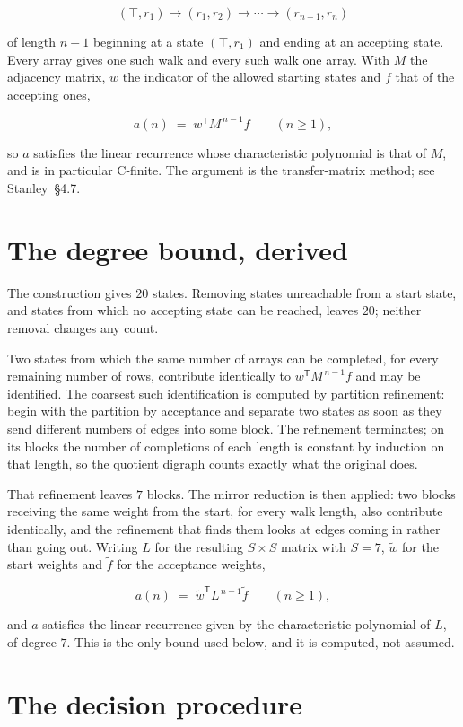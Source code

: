 \documentclass[11pt]{article}
\theoremstyle{definition}
\begin{document}
\[(\top,r_1) \to (r_1,r_2) \to \cdots \to (r_{n-1},r_n)\]

of length $n-1$ beginning at a state $(\top,r_1)$ and ending at an accepting state. Every array gives one such walk and every such walk one array. With $M$ the adjacency matrix, $w$ the indicator of the allowed starting states and $f$ that of the accepting ones,

\[a(n) \;=\; w^{\mathsf T} M^{\,n-1} f \qquad (n \ge 1),\]

so $a$ satisfies the linear recurrence whose characteristic polynomial is that of $M$, and is in particular C-finite. The argument is the transfer-matrix method; see Stanley~\S4.7.

\section{The degree bound, derived}

The construction gives $20$ states. Removing states unreachable from a start state, and states from which no accepting state can be reached, leaves $20$; neither removal changes any count.

Two states from which the same number of arrays can be completed, for every remaining number of rows, contribute identically to $w^{\mathsf T}M^{\,n-1}f$ and may be identified. The coarsest such identification is computed by partition refinement: begin with the partition by acceptance and separate two states as soon as they send different numbers of edges into some block. The refinement terminates; on its blocks the number of completions of each length is constant by induction on that length, so the quotient digraph counts exactly what the original does.

That refinement leaves $7$ blocks. The mirror reduction is then applied: two blocks receiving the same weight from the start, for every walk length, also contribute identically, and the refinement that finds them looks at edges coming in rather than going out. Writing $L$ for the resulting $S \times S$ matrix with $S = 7$, $\tilde w$ for the start weights and $\tilde f$ for the acceptance weights,

\[a(n) \;=\; \tilde w^{\mathsf T} L^{\,n-1} \tilde f \qquad (n \ge 1),\]

and $a$ satisfies the linear recurrence given by the characteristic polynomial of $L$, of degree $7$. This is the only bound used below, and it is computed, not assumed.

\section{The decision procedure}
\end{document}
